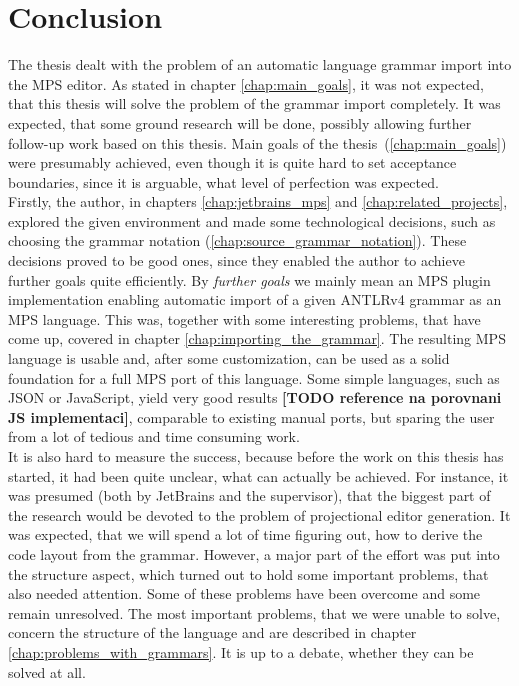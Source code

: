 \chapter{Conclusion}

The thesis dealt with the problem of an automatic language grammar import into the MPS editor.
As stated in chapter \ref{chap:main_goals}, it was not expected, that this thesis will solve the problem of the grammar import completely.
It was expected, that some ground research will be done, possibly allowing further follow-up work based on this thesis.
Main goals of the thesis~(\ref{chap:main_goals}) were presumably achieved, even though it is quite hard to set acceptance boundaries, since it is arguable, what level of perfection was expected.
\\

Firstly, the author, in chapters \ref{chap:jetbrains_mps} and \ref{chap:related_projects}, explored the given environment and made some technological decisions, such as choosing the grammar notation (\ref{chap:source_grammar_notation}).
These decisions proved to be good ones, since they enabled the author to achieve further goals quite efficiently.
By \textit{further goals} we mainly mean an MPS plugin implementation enabling automatic import of a given ANTLRv4 grammar as an MPS language. This was, together with some interesting problems, that have come up, covered in chapter \ref{chap:importing_the_grammar}.
The resulting MPS language is usable and, after some customization, can be used as a solid foundation for a full MPS port of this language.
Some simple languages, such as JSON or JavaScript, yield very good results\textbf{ [TODO reference na porovnani JS implementaci]}, comparable to existing manual ports, but sparing the user from a lot of tedious and time consuming work.
\\

It is also hard to measure the success, because before the work on this thesis has started, it had been quite unclear, what can actually be achieved.
For instance, it was presumed (both by JetBrains and the supervisor), that the biggest part of the research would be devoted to the problem of projectional editor generation.
It was expected, that we will spend a lot of time figuring out, how to derive the code layout from the grammar.
However, a major part of the effort was put into the structure aspect, which turned out to hold some important problems, that also needed attention.
Some of these problems have been overcome and some remain unresolved.
The most important problems, that we were unable to solve, concern the structure of the language and are described in chapter \ref{chap:problems_with_grammars}.
It is up to a debate, whether they can be solved at all.
\\

